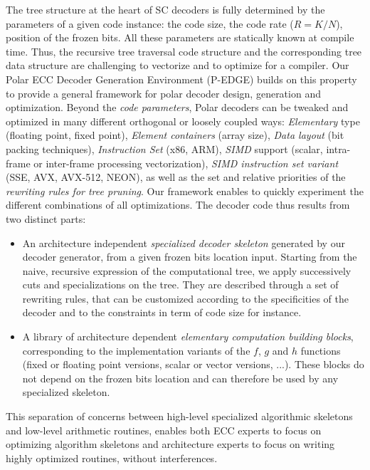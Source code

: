 The tree structure at the heart of SC decoders is fully determined by the
parameters of a given code instance: the code size, the code rate ($R = K / N$),
position of the frozen bits. All these parameters are  statically known at
compile time. Thus, the recursive tree traversal code structure and the
corresponding tree data structure are challenging to vectorize and to optimize
for a compiler. Our Polar ECC Decoder Generation Environment (P-EDGE) builds on
this property to provide a general framework for polar decoder design,
generation and optimization. Beyond the \emph{code parameters}, Polar decoders
can be tweaked and optimized in many different orthogonal or loosely coupled
ways: \emph{Elementary} type (floating point, fixed point),
\emph{Element containers} (array size), \emph{Data layout} (bit packing
techniques), \emph{Instruction Set} (x86, ARM\R), \emph{SIMD} support (scalar,
intra-frame or inter-frame processing vectorization), \emph{SIMD instruction set
variant} (SSE, AVX, AVX-512, NEON), as well as the set and relative priorities
of the \emph{rewriting rules for tree pruning}. Our framework enables to quickly
experiment the different combinations of all optimizations. The decoder code
thus results from two distinct parts:
\begin{itemize}
  \item An architecture independent \emph{specialized decoder skeleton}
    generated by our decoder generator, from a given frozen bits location input.
    Starting from the naive, recursive expression of the computational tree, we
    apply successively cuts and specializations on the tree. They are described
    through a set of rewriting rules, that can be customized according to the
    specificities of the decoder and to the constraints in term of code size for
    instance.
  \item A library of architecture dependent \emph{elementary computation
    building blocks}, corresponding to the implementation variants of the $f$,
    $g$ and $h$ functions (fixed or floating point versions, scalar or vector
    versions, ...). These blocks do not depend on the frozen bits location and
    can therefore be used by any specialized skeleton.
\end{itemize}

This separation of concerns between high-level specialized algorithmic skeletons
and low-level arithmetic routines, enables both ECC experts to focus on
optimizing algorithm skeletons and architecture experts to focus on writing
highly optimized routines, without interferences.


